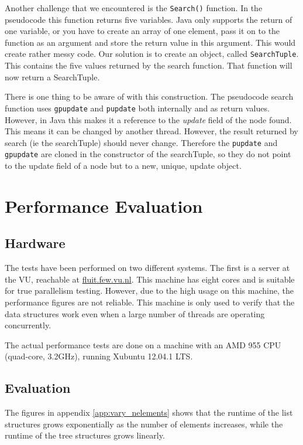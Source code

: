 \documentclass[a4paper]{article}
\begin{document}
Another challenge that we encountered is the \texttt{Search()} function. In the pseudocode
this function returns five variables. Java only supports the return of one variable, or
you have to create an array of one element, pass it on to the function as an argument and
store the return value in this argument. This would create rather messy code. Our solution
is to create an object, called \texttt{SearchTuple}. This contains the five values
returned by the search function. That function will now return a SearchTuple.

There is one thing to be aware of with this construction. The pseudocode search function
uses \texttt{gpupdate} and \texttt{pupdate} both internally and as return values. However,
in Java this makes it a reference to the \emph{update} field of the node found. This means
it can be changed by another thread. However, the result returned by search (ie the
searchTuple) should never change. Therefore the \texttt{pupdate} and \texttt{gpupdate} are
cloned in the constructor of the searchTuple, so they do not point to the update field of
a node but to a new, unique, update object.

\section{Performance Evaluation}

\subsection{Hardware}

The tests have been performed on two different systems. The first is a server
at the VU, reachable at \url{fluit.few.vu.nl}. This machine has eight cores and
is suitable for true parallelism testing. However, due to the high usage on
this machine, the performance figures are not reliable. This machine is only
used to verify that the data structures work even when a large number of
threads are operating concurrently.

The actual performance tests are done on a machine with an AMD 955 CPU
(quad-core, 3.2GHz), running Xubuntu 12.04.1 LTS.

\subsection{Evaluation}

The figures in appendix \ref{app:vary_nelements} shows that the runtime of the
list structures grows exponentially as the number of elements increases, while
the runtime of the tree structures grows linearly.
\end{document}
